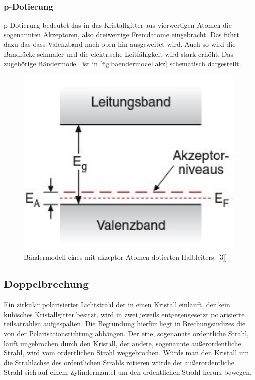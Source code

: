 \subsubsection{p-Dotierung}
\label{sec:pdotierung}
p-Dotierung bedeutet das in das Kristallgitter aus vierwertigen Atomen die sogenannten Akzeptoren, also
dreiwertige Fremdatome eingebracht. Das führt dazu das dass Valenzband nach oben hin ausgeweitet wird.
Auch so wird die Bandlücke schmaler und die elektrische Leitfähigkeit wird stark erhöht. Das zugehörige 
Bändermodell ist in \autoref{fig:baendermodellakz} schematisch dargestellt.
\begin{figure}
  \centering
  \includegraphics[width=1\textwidth]{content/grafiken/akzeptoren.JPG}
  \caption{Bändermodell eines mit akzeptor Atomen dotierten Halbleiters. [3]]}
  \label{fig:baendermodellakz}
\end{figure}


\subsection{Doppelbrechung}
\label{sec:doppelbrechung}
Ein zirkular polarisierter Lichtstrahl der in einen Kristall einläuft, der kein kubisches Kristallgitter 
besitzt, wird in zwei jeweils entgegengesetzt polarisierte teilsatrahlen aufgespalten. Die Begründung hierfür
liegt in Brechungsindizes die von der Polarisationsrichtung abhängen. Der eine, sogenannte ordentliche Strahl,
läuft ungebrochen durch den Kristall, der andere, sogenannte außerordentliche Strahl, wird vom ordentlichen
Strahl weggebrochen. Würde man den Kristall um die Strahlachse des ordentlichen Strahls rotieren würde der
außerordentliche Strahl sich auf einem Zylindermantel um den ordentlichen Strahl herum bewegen.
